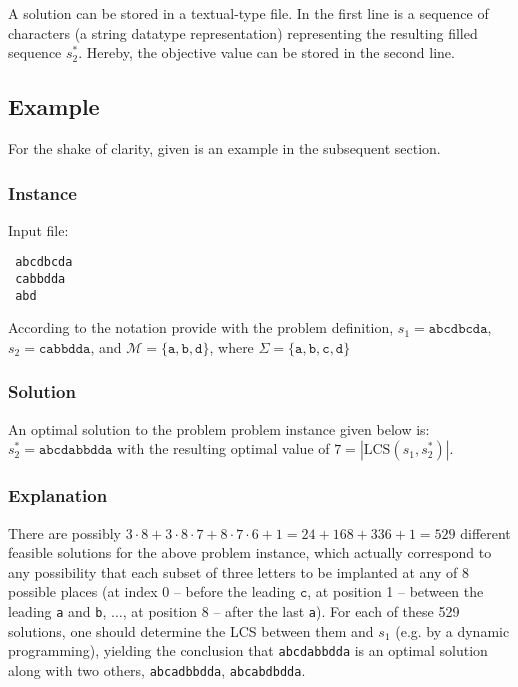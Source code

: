 \documentclass[]{article}
\begin{document}
A solution can be stored in a textual-type file.  In the first line is a sequence of characters (a string datatype representation) representing the resulting filled sequence $s_2^*$. Hereby, the objective value can be stored in the second line.

\subsection{Example}
For the shake of clarity, given is an example in the subsequent section. 

\subsubsection{Instance}

Input file: 
\begin{verbatim}
 abcdbcda
 cabbdda
 abd
\end{verbatim}

According to the notation provide with the problem definition, $s_1=\texttt{abcdbcda}$, $s_2=\texttt{cabbdda}$, and $\mathcal{M}=\{\texttt{a}, \texttt{b}, \texttt{d}\}$, where $\Sigma=\{\texttt{a}, \texttt{b}, \texttt{c}, \texttt{d} \}$ \\

\subsubsection{Solution}

An optimal solution to the problem problem instance given below is: $s_2^*=\texttt{abcdabbdda}$ with the resulting optimal value of $7= |\textrm{LCS}(s_1, s_2^*)|$. 



\subsubsection{Explanation}

There are possibly $ 3 \cdot 8  + 3 \cdot 8 \cdot 7 + 8 \cdot 7 \cdot 6 + 1= 24 + 168 +336+1 =529$ different feasible solutions for the above problem instance, which actually correspond to any possibility that each subset of three letters to be implanted  at any of 8 possible places (at index 0 -- before the leading $\texttt{c}$, at position 1 -- between the leading \texttt{a} and \texttt{b}, $\ldots$, at position 8 -- after the last \texttt{a}). For each of these 529 solutions, one should determine the LCS between them and $s_1$ (e.g. by a dynamic programming), yielding the conclusion that  \texttt{abcdabbdda} is an optimal solution along with two others, \texttt{abcadbbdda}, \texttt{abcabdbdda}. 
\end{document}
